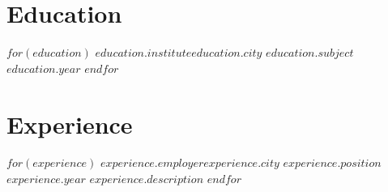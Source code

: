 \documentclass[10pt, a4paper]{article}
\begin{document}
\vspace{-.3cm} %

\section*{Education}
  \resumeSubHeadingListStart
    $for(education)$
      \resumeSubheading
        {$education.institute$}{$education.city$}
        {$education.subject$}{$education.year$} 
    $endfor$
  \resumeSubHeadingListEnd

\vspace{-.3cm} %

\section*{Experience}
  \resumeSubHeadingListStart
    $for(experience)$
      \resumeSubheadingExperience
        {$experience.employer$}{$experience.city$}
        {$experience.position$}{$experience.year$} 
        {$experience.description$}
    $endfor$
  \resumeSubHeadingListEnd
\end{document}
